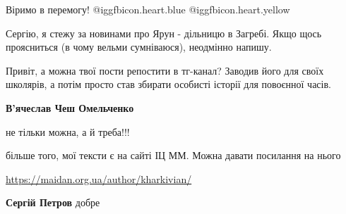 \begin{itemize}
Віримо в перемогу!  @igg{fbicon.heart.blue}  @igg{fbicon.heart.yellow} 


Сергію, я стежу за новинами про Ярун - дільницю в Загребі. Якщо щось
проясниться (в чому вельми сумніваюся), неодмінно напишу.


Привіт, а можна твої пости репостити в тг-канал? Заводив його для своїх
школярів, а потім просто став збирати особисті історії для повоєнної часів.

\textbf{В'ячеслав Чеш Омельченко} 

не тільки можна, а й треба!!!

більше того, мої тексти є на сайті ІЦ ММ. Можна давати посилання на нього

\url{https://maidan.org.ua/author/kharkivian/}

\textbf{Сергій Петров} добре


\end{itemize} %
